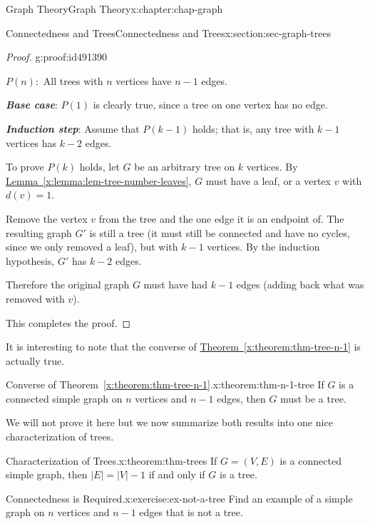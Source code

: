 \documentclass[oneside,10pt,]{book}
\newcommand{\xreffont}{\relax}
\newcommand{\alert}[1]{\textbf{\textit{#1}}}
\numberwithin{equation}{section}
\begin{document}
\begin{chapterptx}{Graph Theory}{}{Graph Theory}{}{}{x:chapter:chap-graph}
\begin{sectionptx}{Connectedness and Trees}{}{Connectedness and Trees}{}{}{x:section:sec-graph-trees}
\begin{proof}{}{g:proof:id491390}
\begin{sidebyside}{1}{0.125}{0.125}{0}
\begin{sbspanel}{0.75}
\(P(n):\) All trees with \(n\) vertices have \(n-1\) edges.%
\end{sbspanel}%
\end{sidebyside}%
\par
\alert{Base case}: \(P(1)\) is clearly true, since a tree on one vertex has no edge.%
\par
\alert{Induction step}: Assume that \(P(k-1)\) holds; that is, any tree with \(k-1\) vertices has \(k-2\) edges.%
\par
To prove \(P(k)\) holds, let \(G\) be an arbitrary tree on \(k\) vertices. By \hyperref[x:lemma:lem-tree-number-leaves]{Lemma~{\xreffont\ref{x:lemma:lem-tree-number-leaves}}}, \(G\) must have a leaf, or a vertex \(v\) with \(d(v) = 1\).%
\par
Remove the vertex \(v\) from the tree and the one edge it is an endpoint of. The resulting graph \(G'\) is still a tree (it must still be connected and have no cycles, since we only removed a leaf), but with \(k-1\) vertices. By the induction hypothesis, \(G'\) has \(k-2\) edges.%
\par
Therefore the original graph \(G\) must have had \(k-1\) edges (adding back what was removed with \(v\)).%
\par
This completes the proof.%
\end{proof}
It is interesting to note that the converse of \hyperref[x:theorem:thm-tree-n-1]{Theorem~{\xreffont\ref{x:theorem:thm-tree-n-1}}} is actually true.%
\begin{theorem}{Converse of Theorem~{\xreffont\ref*{x:theorem:thm-tree-n-1}}.}{}{x:theorem:thm-n-1-tree}%
If \(G\) is a connected simple graph on \(n\) vertices and \(n-1\) edges, then \(G\) must be a tree.%
\end{theorem}
We will not prove it here but we now summarize both results into one nice characterization of trees.%
\begin{theorem}{Characterization of Trees.}{}{x:theorem:thm-trees}%
If \(G = (V,E)\) is a connected simple graph, then \(|E| = |V| - 1\) if and only if \(G\) is a tree.%
\end{theorem}
\begin{inlineexercise}{Connectedness is Required.}{x:exercise:ex-not-a-tree}%
Find an example of a simple graph on \(n\) vertices and \(n-1\) edges that is not a tree.%
\end{inlineexercise}
\end{sectionptx}
%
%
\typeout{************************************************}
\typeout{************************************************}

\end{chapterptx}
\end{document}
